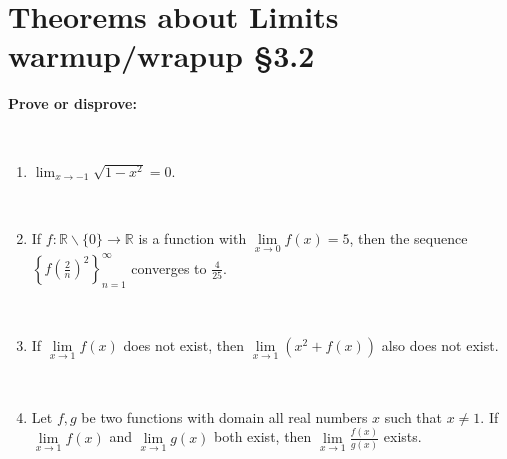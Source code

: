 \documentclass[12pt]{amsart}
\begin{document}
	
	
	\thispagestyle{empty}
	
	\section*{Theorems about Limits warmup/wrapup \S 3.2}
	
	\textbf{Prove or disprove:}
	
	\
	
	\begin{enumerate}
	\item $\displaystyle \lim_{x\to -1} \sqrt{1-x^2} = 0$.
	
	\
	
	\item If $f: \mathbb{R} \smallsetminus \{0\}\to \mathbb{R}$ is a function with $\lim\limits_{x\to 0} f(x) = 5$, then the sequence $\left\{f\!\left(\frac{2}{n}\right)^{2} \right\}_{n=1}^\infty$ converges to $\displaystyle\frac{4}{25}$.
	
	\
	
	\item If $\lim\limits_{x\to 1} f(x)$ does not exist, then $\lim\limits_{x\to 1} \left(x^2 + f(x)\right)$ also does not exist.
	
	
	\
	
	\item Let $f,g$ be two functions with domain all real numbers $x$ such that $x\neq 1$. If $\lim\limits_{x\to 1} f(x)$ and $\lim\limits_{x\to 1} g(x)$ both exist, then $\lim\limits_{x\to 1} \displaystyle\frac{f(x)}{g(x)}$ exists.

\end{enumerate}
\end{document}
